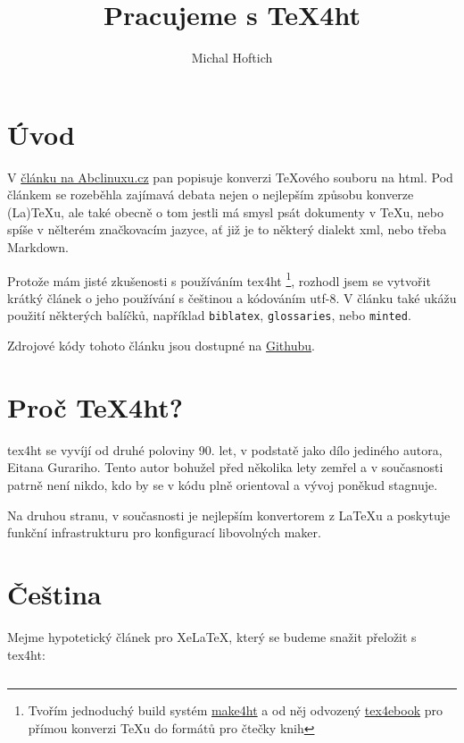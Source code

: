 \documentclass{article}
\begin{document}
\title{Pracujeme s TeX4ht}
\author{Michal Hoftich}
\maketitle
\tableofcontents
\section{Úvod}
V \href{http://www.abclinuxu.cz/clanky/tex-5-priklad-makra-pro-generovani-html}{článku na Abclinuxu.cz} 
pan \textcite{Olsak13}  popisuje konverzi \TeX ového souboru na html. 
Pod článkem se rozeběhla zajímavá debata nejen o nejlepším způsobu konverze
(La)\TeX u, ale také obecně o tom jestli má smysl psát dokumenty v \TeX u, nebo spíše v nělterém značkovacím jazyce, ať již je to některý dialekt xml, nebo třeba Markdown.

Protože mám jisté zkušenosti s používáním \gls{tex4ht}%
\footnote{Tvořím jednoduchý build systém \href{https://github.com/michal-h21/make4ht}{make4ht} 
a od něj odvozený \href{https://github.com/michal-h21/tex4ebook}{tex4ebook} 
pro přímou konverzi \TeX u do formátů pro čtečky knih},
rozhodl jsem se vytvořit krátký článek o jeho používání s češtinou a kódováním utf-8. V článku také ukážu použití některých balíčků, například \verb|biblatex|,
\verb|glossaries|, nebo \verb|minted|.

Zdrojové kódy tohoto článku jsou dostupné na \href{https://github.com/michal-h21/abcclanek}{Githubu}.

\section{Proč TeX4ht?}

\gls{tex4ht} se vyvíjí od druhé poloviny 90. let, v podstatě jako dílo 
jediného autora, Eitana Gurariho. Tento autor bohužel před několika lety zemřel
a v současnosti patrně není nikdo, kdo by se v kódu plně orientoval a vývoj poněkud stagnuje. 

Na druhou stranu, v současnosti je nejlepším konvertorem z 
\LaTeX u a poskytuje funkční infrastrukturu pro konfigurací libovolných maker.

\section{Čeština}

Mejme hypotetický článek pro Xe\LaTeX, který se budeme snažit přeložit s \gls{tex4ht}:

\inputminted{latex}{priklady/priklad1.tex}



\printglossary
\printbibliography
\end{document}
